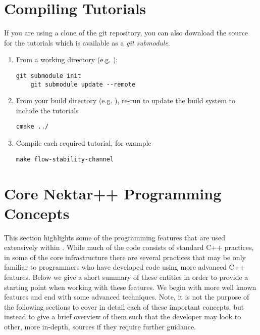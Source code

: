 \section{Compiling Tutorials}
If you are using a clone of the \nekpp git repository, you can also download
the source for the \nekpp tutorials which is available as a \emph{git submodule}.

\begin{enumerate}
    \item From a \nekpp working directory (e.g. ):
    \begin{lstlisting}[style=BashInputStyle]
    git submodule init
    git submodule update --remote
    \end{lstlisting}
    \item From your build directory (e.g. ), re-run  to update the build system to include the tutorials
    \begin{lstlisting}[style=BashInputStyle]
    cmake ../
    \end{lstlisting}
    \item Compile each required tutorial, for example
    \begin{lstlisting}[style=BashInputStyle]
    make flow-stability-channel
    \end{lstlisting}
\end{enumerate}



\section{Core Nektar++ Programming Concepts}
\lstset{style=C++Style}

This section highlights some of the programming features that are used
extensively within {\nek}. While much of the code consists of
standard C++ practices, in some of the core infrastructure there are
several practices that may be only familiar to programmers who have
developed code using more advanced C++ features.  Below we give a
short summary of these entities in order to provide a starting point
when working with these features. We begin with more well known
features and end with some advanced techniques.  Note, it is not the
purpose of the following sections to cover in detail each of these
important concepts, but instead to give a brief overview of them such that the developer may look to other, more in-depth, sources if
they require further guidance.

